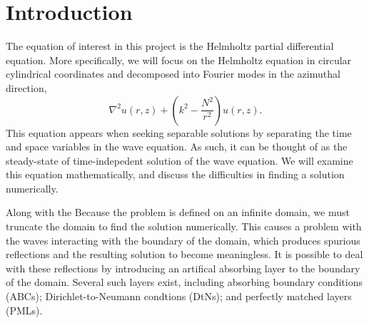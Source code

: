 \chapter{Introduction}


\iffalse Brief outline of the chapter below

Background:
	What is HH equation?
	What does it model?
	How is it derived?
	Boundary conditions
	- 	Sommerfield radiation condition
	
Finite element method:
	Discretisation of HH
	Discretisation of infinite domains
		D,N,radiation
	ABC, DtN, PML

Linear solvers:
	Iterative and direct
	Krylov methods
	Preconditioners
	How does this relate to Poisson and HH?
	- 	Small wavenumbers good convergence

Project direction:
	Where are we going? What to do...?
	Multigrid in non-cartesian coordinates
	Fourier decompostion of HH
	Explore implementation of PMLs
\fi




The equation of interest in this project is the Helmholtz partial differential equation.
More specifically, we will focus on the Helmholtz equation in circular cylindrical coordinates and decomposed into Fourier modes in the azimuthal direction,
\begin{equation}
	\nabla^2 u(r,z) + \left(k^2-\frac{N^2}{r^2}\right) u(r,z).
\end{equation}
This equation appears when seeking separable solutions by separating the time and space variables in the wave equation.
As such, it can be thought of as the steady-state of time-indepedent solution of the wave equation.
We will examine this equation mathematically, and discuss the difficulties in finding a solution numerically.

Along with the 
Because the problem is defined on an infinite domain, we must truncate the domain to find the solution numerically.
This causes a problem with the waves interacting with the boundary of the domain, which produces spurious reflections and the resulting solution to become meaningless.
It is possible to deal with these reflections by introducing an artifical absorbing layer to the boundary of the domain.
Several such layers exist, including absorbing boundary conditions (ABCs); Dirichlet-to-Neumann condtions (DtNs); and perfectly matched layers (PMLs).

